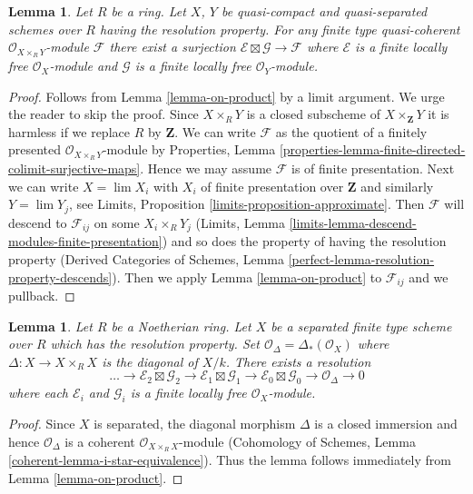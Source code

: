 \documentclass{stacks-project}
\theoremstyle{plain}
\newtheorem{lemma}[subsection]{Lemma}
\theoremstyle{definition}
\theoremstyle{remark}
\numberwithin{equation}{subsection}
\def\lim{\mathop{\mathrm{lim}}\nolimits}
\begin{document}
\begin{lemma}
\label{lemma-on-product-general}
Let $R$ be a ring. Let $X$, $Y$ be quasi-compact and quasi-separated
schemes over $R$ having the resolution property. For any finite
type quasi-coherent $\mathcal{O}_{X \times_R Y}$-module $\mathcal{F}$
there exist a surjection $\mathcal{E} \boxtimes \mathcal{G} \to \mathcal{F}$
where $\mathcal{E}$ is a finite locally free $\mathcal{O}_X$-module
and $\mathcal{G}$ is a finite locally free $\mathcal{O}_Y$-module.
\end{lemma}

\begin{proof}
Follows from Lemma \ref{lemma-on-product} by a limit argument.
We urge the reader to skip the proof.
Since $X \times_R Y$ is a closed subscheme of $X \times_\mathbf{Z} Y$
it is harmless if we replace $R$ by $\mathbf{Z}$.
We can write $\mathcal{F}$ as the quotient of
a finitely presented $\mathcal{O}_{X \times_R Y}$-module by
Properties, Lemma
\ref{properties-lemma-finite-directed-colimit-surjective-maps}.
Hence we may assume $\mathcal{F}$ is of
finite presentation. Next we can write $X = \lim X_i$
with $X_i$ of finite presentation over $\mathbf{Z}$ and similarly
$Y = \lim Y_j$, see Limits, Proposition \ref{limits-proposition-approximate}.
Then $\mathcal{F}$ will descend to $\mathcal{F}_{ij}$ on some $X_i \times_R Y_j$
(Limits, Lemma \ref{limits-lemma-descend-modules-finite-presentation}) and
so does the property of having the resolution property
(Derived Categories of Schemes, Lemma
\ref{perfect-lemma-resolution-property-descends}).
Then we apply Lemma \ref{lemma-on-product}
to $\mathcal{F}_{ij}$ and we pullback.
\end{proof}

\begin{lemma}
\label{lemma-diagonal-resolution}
Let $R$ be a Noetherian ring. Let $X$ be a separated finite type scheme
over $R$ which has the resolution property. Set
$\mathcal{O}_\Delta = \Delta_*(\mathcal{O}_X)$ where
$\Delta : X \to X \times_R X$ is the diagonal of $X/k$.
There exists a resolution
$$
\ldots \to
\mathcal{E}_2 \boxtimes \mathcal{G}_2 \to
\mathcal{E}_1 \boxtimes \mathcal{G}_1 \to
\mathcal{E}_0 \boxtimes \mathcal{G}_0 \to
\mathcal{O}_\Delta \to 0
$$
where each $\mathcal{E}_i$ and $\mathcal{G}_i$ is a finite locally
free $\mathcal{O}_X$-module.
\end{lemma}

\begin{proof}
Since $X$ is separated, the diagonal morphism $\Delta$ is a closed
immersion and hence $\mathcal{O}_\Delta$ is a coherent
$\mathcal{O}_{X \times_R X}$-module (Cohomology of Schemes, Lemma
\ref{coherent-lemma-i-star-equivalence}).
Thus the lemma follows immediately from Lemma \ref{lemma-on-product}.
\end{proof}
\end{document}
